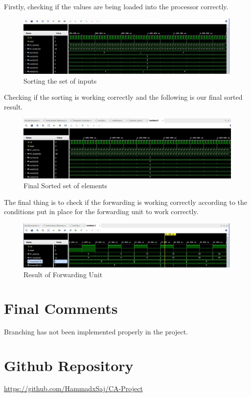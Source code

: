 \documentclass{article}
\begin{document}
Firstly, checking if the values are being loaded into the processor correctly. 

\begin{figure}[h]
    \centering
    \includegraphics*[width = 13 cm]{firstsorting.jpeg}
    \caption{Sorting the set of inputs}
    \label{fig: label 2}
\end{figure}

Checking if the sorting is working correctly and the following is our final sorted result. 

\begin{figure}[h]
    \centering
    \includegraphics*[width = 13 cm]{final_sorted.jpeg}
    \caption{Final Sorted set of elements}
    \label{fig: label 3}
\end{figure}

\newpage

The final thing is to check if the forwarding is working correctly according to the conditions put in place for the forwarding unit to work correctly.

\begin{figure}[h]
    \centering
    \includegraphics*[width = 13 cm]{forwarding.jpeg}
    \caption{Result of Forwarding Unit}
    \label{fig: label 4}
\end{figure}

\section{Final Comments}
Branching has not been implemented properly in the project. 


\section{Github Repository}

\href{https://github.com/HammadxSaj/CA-Project}{https://github.com/HammadxSaj/CA-Project}
\end{document}
